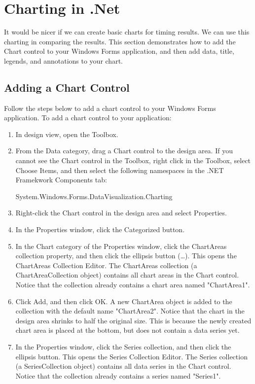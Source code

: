 \documentclass[12pt,a4paper,final,twoside,titlepage]{book}
\begin{document}
\section{Charting in .Net}
It would be nicer if we can create basic charts for timing results. We can use this charting in comparing the results. This section demonstrates how to add the Chart control to your Windows Forms application, and then add data, title, legends, and annotations to your chart. 
\subsection{Adding a Chart Control}
Follow the steps below to add a chart control to your Windows Forms application.
To add a chart control to your application:
\begin{enumerate}
\item In design view, open the Toolbox.
\item From the Data category, drag a Chart control to the design area.
If you cannot see the Chart control in the Toolbox, right click in the Toolbox, select Choose Items, and then select the following namespaces in the .NET Framekwork Components tab:
\begin{center}
System.Windows.Forms.DataVisualization.Charting 
\end{center}
\item Right-click the Chart control in the design area and select Properties.
\item In the Properties window, click the Categorized button.
\item In the Chart category of the Properties window, click the ChartAreas collection property, and then click the ellipsis button (…). This opens the ChartAreas Collection Editor.
The ChartAreas collection (a ChartAreaCollection object) contains all chart areas in the Chart control. Notice that the collection already contains a chart area named "ChartArea1".
\item Click Add, and then click OK. A new ChartArea object is added to the collection with the default name "ChartArea2".
Notice that the chart in the design area shrinks to half the original size. This is because the newly created chart area is placed at the bottom, but does not contain a data series yet.
\item In the Properties window, click the Series collection, and then click the ellipsis button. This opens the Series Collection Editor.
The Series collection (a SeriesCollection object) contains all data series in the Chart control. Notice that the collection already contains a series named "Series1".

\end{enumerate}
\end{document}
